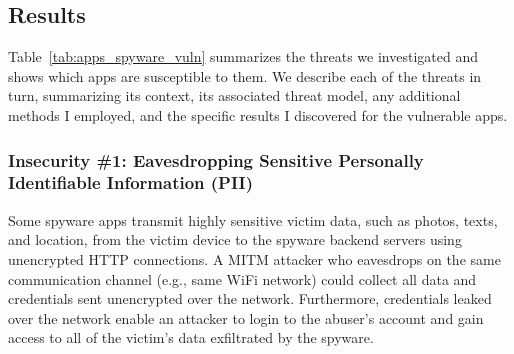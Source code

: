 \subsection{Results}

Table~\ref{tab:apps_spyware_vuln} summarizes the threats we
investigated and shows which apps are susceptible to them.
%
We describe each of the threats in turn, summarizing its context, its
associated threat model, any additional methods I employed, and the
specific results I discovered for the vulnerable apps.




\subsubsection*{Insecurity \#1: Eavesdropping Sensitive Personally Identifiable Information (PII)}

Some spyware apps transmit highly sensitive victim data, such as photos,
texts, and location, from the victim device to the spyware backend
servers using unencrypted HTTP connections.  A MITM attacker who
eavesdrops on the same communication channel (e.g., same WiFi network)
could collect all data and credentials sent unencrypted
over the network.  Furthermore, credentials leaked over the network enable
an attacker to login to the abuser's account and gain access to all of
the victim's data exfiltrated by the spyware.

